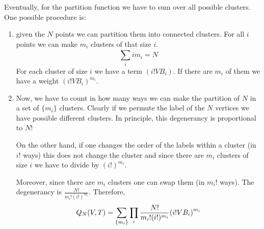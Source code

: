 \documentclass[../main/main.tex]{subfiles}
\begin{document}
Eventually, for the partition function we have to sum over all possible clusters.
One possible procedure is:
\begin{enumerate}
\item given the \( N \) points we can partition them into connected clusters. For all \( i \) points we can make \( m_i \) clusters of that size \( i \).
\begin{equation*}
  \sum_{i}^{} i m_i = N
\end{equation*}
For each cluster of size \( i \) we have a term \( (i!VB_i) \). If there are \( m_i \) of them we have a weight \( (i! V B_i)^{m_i} \).
\item Now, we have to count in how many ways we can make the partition of \( N \) in a set of \( \{ m_i \}   \) clusters. Clearly if we permute the label of the \( N \) vertices we have possible different clusters. In principle, this degenerancy is proportional to \( N \)!

On the other hand, if one changes the order of the labels within a cluster (in \( i! \) ways) this does not change the cluster and since there are \( m_i \) clusters of size \( i \) we have to divide by \( (i!)^{m_i} \).

Moreover, since there are \( m_i \) clusters one can swap them (in \( m_i! \) ways). The degenerancy is \( \frac{N!}{m_i! (i!)^{m_i}} \). Therefore,
\begin{equation}
  Q_N (V,T) = \sum_{\{ m_i \}  }^{} \prod_{i}^{}    \frac{N!}{m_i! (i!)^{m_i}} \qty(i! V B_i)^{m_i}
\end{equation}
\end{enumerate}
\end{document}
